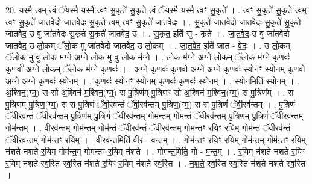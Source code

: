 \documentclass[17pt]{extarticle}
\begin{document}
20. यस्मै॒ त्वम् त्वं ॅयस्मै॒ यस्मै॒ त्वꣳ सु॒कृते॑ सु॒कृते॒ त्वं ॅयस्मै॒ यस्मै॒ त्वꣳ सु॒कृते᳚ । . त्वꣳ सु॒कृते॑ सु॒कृते॒ त्वम् त्वꣳ सु॒कृते॑ जातवेदो जातवेदः सु॒कृते॒ त्वम् त्वꣳ सु॒कृते॑ जातवेदः । . सु॒कृते॑ जातवेदो जातवेदः सु॒कृते॑ सु॒कृते॑ जातवेद॒ उ वु जा॑तवेदः सु॒कृते॑ सु॒कृते॑ जातवेद॒ उ । . सु॒कृत॒ इति॑ सु - कृते᳚ । . जा॒त॒वे॒द॒ उ वु जा॑तवेदो जातवेद॒ उ लो॒कम् ॅलो॒क मु जा॑तवेदो जातवेद॒ उ लो॒कम् । . जा॒त॒वे॒द॒ इति॑ जात - वे॒दः॒ । . उ लो॒कम् ॅलो॒क मु वु लो॒क म॑ग्ने अग्ने लो॒क मु वु लो॒क म॑ग्ने । . लो॒क म॑ग्ने अग्ने लो॒कम् ॅलो॒क म॑ग्ने कृ॒णवः॑ कृ॒णवो॑ अग्ने लो॒कम् ॅलो॒क म॑ग्ने कृ॒णवः॑ । . अ॒ग्ने॒ कृ॒णवः॑ कृ॒णवो॑ अग्ने अग्ने कृ॒णवः॑ स्यो॒नꣳ स्यो॒नम् कृ॒णवो॑ अग्ने अग्ने कृ॒णवः॑ स्यो॒नम् । . कृ॒णवः॑ स्यो॒नꣳ स्यो॒नम् कृ॒णवः॑ कृ॒णवः॑ स्यो॒नम् । . स्यो॒नमिति॑ स्यो॒नम् । . अ॒श्विन॒(ग्म्॒) स सो अ॒श्विन॑ म॒श्विन॒(ग्म्॒) स पु॒त्रिण॑म् पु॒त्रिणꣳ॒॒ सो अ॒श्विन॑ म॒श्विन॒(ग्म्॒) स पु॒त्रिण᳚म् । . स पु॒त्रिण॑म् पु॒त्रिण॒(ग्म्॒) स स पु॒त्रिणं॑ ॅवी॒रव॑न्तं ॅवी॒रव॑न्तम् पु॒त्रिण॒(ग्म्॒) स स पु॒त्रिणं॑ ॅवी॒रव॑न्तम् । . पु॒त्रिणं॑ ॅवी॒रव॑न्तं ॅवी॒रव॑न्तम् पु॒त्रिण॑म् पु॒त्रिणं॑ ॅवी॒रव॑न्त॒म् गोम॑न्त॒म् गोम॑न्तं ॅवी॒रव॑न्तम् पु॒त्रिण॑म् पु॒त्रिणं॑ ॅवी॒रव॑न्त॒म् गोम॑न्तम् । . वी॒रव॑न्त॒म् गोम॑न्त॒म् गोम॑न्तं ॅवी॒रव॑न्तं ॅवी॒रव॑न्त॒म् गोम॑न्तꣳ र॒यिꣳ र॒यिम् गोम॑न्तं ॅवी॒रव॑न्तं ॅवी॒रव॑न्त॒म् गोम॑न्तꣳ र॒यिम् । . वी॒रव॑न्त॒मिति॑ वी॒र - व॒न्त॒म् । . गोम॑न्तꣳ र॒यिꣳ र॒यिम् गोम॑न्त॒म् गोम॑न्तꣳ र॒यिम् न॑शते नशते र॒यिम् गोम॑न्त॒म् गोम॑न्तꣳ र॒यिम् न॑शते । . गोम॑न्त॒मिति॒ गो - म॒न्त॒म् । . र॒यिम् न॑शते नशते र॒यिꣳ र॒यिम् न॑शते स्व॒स्ति स्व॒स्ति न॑शते र॒यिꣳ र॒यिम् न॑शते स्व॒स्ति । . न॒श॒ते॒ स्व॒स्ति स्व॒स्ति न॑शते नशते स्व॒स्ति । \newline
\end{document}
